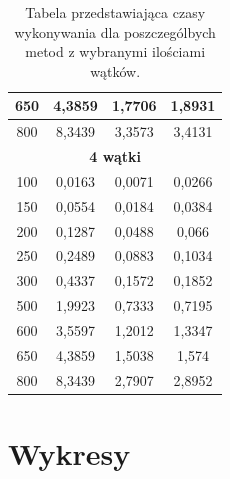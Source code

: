 \documentclass{report}
\begin{document}
\begin{table}[H]
\begin{tabular}{|cccc|}
		\multicolumn{1}{|c|}{650}                       & \multicolumn{1}{c|}{4,3859}     & \multicolumn{1}{c|}{1,7706}      & 1,8931      \\ \hline
		\multicolumn{1}{|c|}{800}                       & \multicolumn{1}{c|}{8,3439}     & \multicolumn{1}{c|}{3,3573}      & 3,4131      \\ \hline
		\multicolumn{4}{|c|}{\textbf{4 wątki}}                                                                                             \\ \hline
		\multicolumn{1}{|c|}{100}                       & \multicolumn{1}{c|}{0,0163}     & \multicolumn{1}{c|}{0,0071}      & 0,0266      \\ \hline
		\multicolumn{1}{|c|}{150}                       & \multicolumn{1}{c|}{0,0554}     & \multicolumn{1}{c|}{0,0184}      & 0,0384      \\ \hline
		\multicolumn{1}{|c|}{200}                       & \multicolumn{1}{c|}{0,1287}     & \multicolumn{1}{c|}{0,0488}      & 0,066       \\ \hline
		\multicolumn{1}{|c|}{250}                       & \multicolumn{1}{c|}{0,2489}     & \multicolumn{1}{c|}{0,0883}      & 0,1034      \\ \hline
		\multicolumn{1}{|c|}{300}                       & \multicolumn{1}{c|}{0,4337}     & \multicolumn{1}{c|}{0,1572}      & 0,1852      \\ \hline
		\multicolumn{1}{|c|}{500}                       & \multicolumn{1}{c|}{1,9923}     & \multicolumn{1}{c|}{0,7333}      & 0,7195      \\ \hline
		\multicolumn{1}{|c|}{600}                       & \multicolumn{1}{c|}{3,5597}     & \multicolumn{1}{c|}{1,2012}      & 1,3347      \\ \hline
		\multicolumn{1}{|c|}{650}                       & \multicolumn{1}{c|}{4,3859}     & \multicolumn{1}{c|}{1,5038}      & 1,574       \\ \hline
		\multicolumn{1}{|c|}{800}                       & \multicolumn{1}{c|}{8,3439}     & \multicolumn{1}{c|}{2,7907}      & 2,8952      \\ \hline
	\end{tabular}
	\caption{Tabela przedstawiająca czasy wykonywania dla poszczególbych metod z wybranymi ilościami wątków.}
\end{table}

{\let\clearpage\relax\chapter{Wykresy}}
\end{document}
